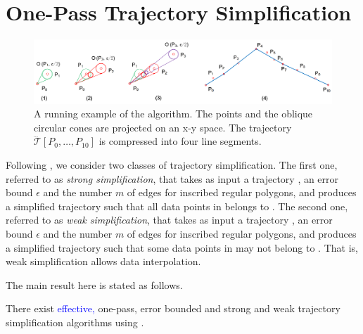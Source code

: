 \section{One-Pass Trajectory Simplification}
\label{sec-alg}


\begin{figure}[tb!]
	\centering
	\includegraphics[scale=0.8]{figures/Fig-Ex-Conest.png}
	\caption{\small A running example of the \cist algorithm. The points and the oblique circular cones are projected on an x-y space. The trajectory $\dddot{\mathcal{T}}[P_0, \ldots, P_{10}]$ is compressed into four line segments.}
	\label{fig:exm-const}
\end{figure}


Following \cite{Trajcevski:DDR,Lin:Operb}, we consider two classes of trajectory simplification.
The first one, referred to as \emph{strong simplification}, that takes as input a trajectory , an error bound $\epsilon$ and the number $m$ of edges for inscribed regular polygons, and produces a simplified trajectory  such that all data points in  belongs to .
The second one, referred to as \emph{weak simplification}, that takes as input a trajectory , an error bound $\epsilon$ and the number $m$ of edges for inscribed regular polygons, and produces a simplified trajectory  such that some data points in  may not belong to . That is, weak simplification allows data interpolation.

The main result here is stated as follows.

\begin{theorem}
\label{prop-cist-op}
There exist \textcolor{blue}{effective,} one-pass, error bounded and strong and weak trajectory simplification algorithms using \sed.
\end{theorem}

